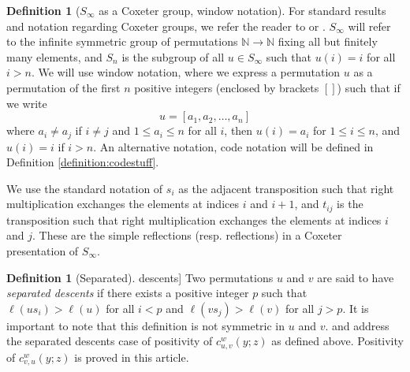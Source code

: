 \documentclass{amsart}
\theoremstyle{definition}
\newtheorem{definition}[lemma]{Definition}
\theoremstyle{remark}
\numberwithin{equation}{subsection}
\begin{document}
\begin{definition}[$S_\infty$ as a Coxeter group, window notation]
	For standard results and notation regarding Coxeter groups, we refer the reader to \cite{combcox} or \cite{humphreys1992reflection}. $S_\infty$ will refer to the infinite symmetric group of permutations $\mathbb N\to\mathbb N$ fixing all but finitely many elements, and $S_n$ is the subgroup of all $u\in S_\infty$ such that $u(i)=i$ for all $i>n$. We will use window notation, where we express a permutation $u$ as a permutation of the first $n$ positive integers (enclosed by brackets $[]$) such that if we write
	$$u=[a_1,a_2,\ldots,a_n]$$
	where $a_i\neq a_j$ if $i\neq j$ and $1\leq a_i\leq n$ for all $i$, then $u(i)=a_i$ for $1\leq i\leq n$, and $u(i)=i$ if $i>n$. An alternative notation, code notation will be defined in Definition \ref{definition:codestuff}.
	
	We use the standard notation of $s_i$ as the adjacent transposition such that right multiplication exchanges the elements at indices $i$ and $i+1$, and $t_{ij}$ is the transposition such that right multiplication exchanges the elements at indices $i$ and $j$. These are the simple reflections (resp. reflections) in a Coxeter presentation of $S_\infty$.
\end{definition}

\begin{definition}[Separated] descents] \label{definition:sepdesc}
	Two permutations $u$ and $v$ are said to have \emph{separated descents} if there exists a positive integer $p$ such that $\ell(us_i) > \ell(u)$ for all $i < p$ and $\ell(vs_j) > \ell(v)$ for all $j>p$. It is important to note that this definition is not symmetric in $u$ and $v$. \cite{samuelmolev} and \cite{fan2025bumpless} address the separated descents case of positivity of $c_{u,v}^w(y;z)$ as defined above. Positivity of $c_{v,u}^w(y;z)$ is proved in this article.
\end{definition}
\end{document}
